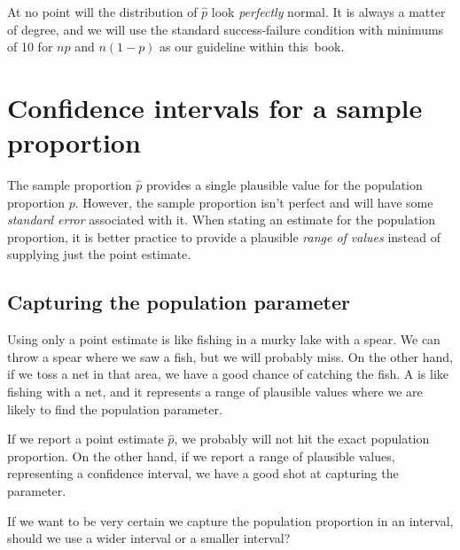 At no point will the distribution of $\hat{p}$ look
\emph{perfectly} normal.
It is always a matter of degree, and we will use
the standard success-failure condition with minimums
of 10 for $np$ and $n (1 - p)$ as our guideline
within this~book.




\section{Confidence intervals for a sample proportion}
\label{confidenceIntervals}


The sample proportion $\hat{p}$ provides a single plausible value
for the population proportion $p$. However, the sample proportion
isn't perfect and will have some \emph{standard error}
associated with it. When stating an estimate for the population 
proportion, it is better practice to provide a plausible 
\emph{range of values} instead of supplying just the point estimate.

\subsection{Capturing the population parameter}

Using only a point estimate is like fishing in a murky
lake with a spear. We can throw a spear where we
saw a fish, but we will probably miss. On the other hand,
if we toss a net in that area, we have a good chance of
catching the fish.
A  is like fishing with a net,
and it represents a range of plausible values where we
are likely to find the population parameter.

If we report a point estimate $\hat{p}$, we probably
will not hit the exact population proportion. On the
other hand, if we report a range of plausible values,
representing a confidence interval,
we have a good shot at capturing the parameter.

\begin{exercisewrap}
\begin{nexercise}
If we want to be very certain we capture the population
proportion in an interval, should we use a wider interval
or a smaller interval?\footnotemark
\end{nexercise}
\end{exercisewrap}

